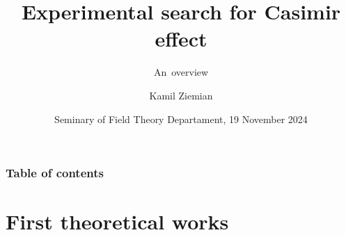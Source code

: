 \documentclass[10pt,t]{beamer}
\title{Experimental search for Casimir effect}
\subtitle{An~overview}
\author{Kamil Ziemian \\
  \email}
\date[19 XI 2024]{Seminary of Field Theory Departament,
  19 November 2024}
\begin{document}





\RaggedRight





\maketitle





\begin{frame}
  \frametitle{Table of contents}


  \tableofcontents %

\end{frame}

























\section{First theoretical works}
\end{document}
